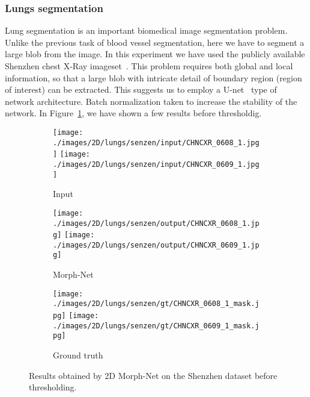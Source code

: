 \documentclass[12pt]{article}
\begin{document}
\subsubsection{Lungs segmentation}
Lung segmentation is an important biomedical image segmentation problem. Unlike the previous task of blood vessel segmentation, here we have to segment a large blob from the image. In this experiment 
we have used the publicly available Shenzhen chest X-Ray imageset~\cite{jaeger2014two}. This problem requires both global and local information, so that a large blob with intricate detail of boundary region (region of interest) can be extracted. This suggests us to employ a U-net~\cite{ronneberger2015u} type of network architecture. Batch normalization taken to increase the stability of the network. In Figure~\ref{Shenzhen_qual}, we have shown a few results before thresholdig.


\begin{figure}[h!]
    \centering
    \begin{subfigure}[t]{0.325\linewidth}
        \texttt{[image: ./images/2D/lungs/senzen/input/CHNCXR\_0608\_1.jpg]}
        \texttt{[image: ./images/2D/lungs/senzen/input/CHNCXR\_0609\_1.jpg]}
        \caption{Input}
    \end{subfigure}
    \begin{subfigure}[t]{0.325\linewidth}
        \texttt{[image: ./images/2D/lungs/senzen/output/CHNCXR\_0608\_1.jpg]}
        \texttt{[image: ./images/2D/lungs/senzen/output/CHNCXR\_0609\_1.jpg]}
        \caption{Morph-Net}
    \end{subfigure}
    \begin{subfigure}[t]{0.325\linewidth}
        \texttt{[image: ./images/2D/lungs/senzen/gt/CHNCXR\_0608\_1\_mask.jpg]}
        \texttt{[image: ./images/2D/lungs/senzen/gt/CHNCXR\_0609\_1\_mask.jpg]}
        \caption{Ground truth}
    \end{subfigure}
\caption{Results obtained by 2D Morph-Net on the Shenzhen dataset\cite{jaeger2014two} before thresholding.}
\label{Shenzhen_qual}
\end{figure}
\end{document}
